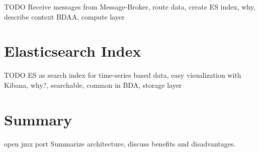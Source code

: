TODO
Receive messages from Message-Broker, route data, create ES index, why, describe context BDAA, compute layer
%
\section{Elasticsearch Index}
TODO
ES as search index for time-series based data, easy visualization with Kibana, why?, searchable, common in BDA, storage layer

\section{Summary}

open jmx port
Summarize architecture, discuss benefits and disadvantages.



